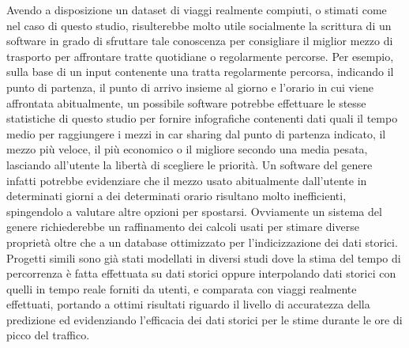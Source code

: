 Avendo a disposizione un dataset di viaggi realmente compiuti, o stimati come nel caso di questo studio, risulterebbe molto utile socialmente la scrittura di un software in grado di sfruttare tale conoscenza per consigliare il miglior mezzo di trasporto per affrontare tratte quotidiane o regolarmente percorse. Per esempio, sulla base di un input contenente una tratta regolarmente percorsa, indicando il punto di partenza, il punto di arrivo insieme al giorno e l'orario in cui viene affrontata abitualmente, un possibile software potrebbe effettuare le stesse statistiche di questo studio per fornire infografiche contenenti dati quali il tempo medio per raggiungere i mezzi in car sharing dal punto di partenza indicato, il mezzo più veloce, il più economico o il migliore secondo una media pesata, lasciando all'utente la libertà di scegliere le priorità. Un software del genere infatti potrebbe evidenziare che il mezzo usato abitualmente dall'utente in determinati giorni a dei determinati orario risultano molto inefficienti, spingendolo a valutare altre opzioni per spostarsi. Ovviamente un sistema del genere richiederebbe un raffinamento dei calcoli usati per stimare diverse proprietà oltre che a un database ottimizzato per l'indicizzazione dei dati storici. Progetti simili sono già stati modellati in diversi studi dove la stima del tempo di percorrenza è fatta effettuata su dati storici oppure interpolando dati storici con quelli in tempo reale forniti da utenti, e comparata con viaggi realmente effettuati, portando a ottimi risultati riguardo il livello di accuratezza della predizione ed evidenziando l'efficacia dei dati storici per le stime durante le ore di picco del traffico\cite{deeshma2014}\cite{chien2003}.
